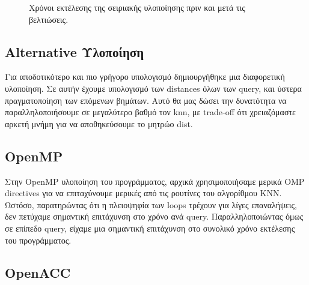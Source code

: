 \documentclass[11pt]{scrartcl} %
\begin{document}
\begin{figure}[H]
    \begin{center}
    \end{center}
    \caption{Χρόνοι εκτέλεσης της σειριακής υλοποίησης πριν και μετά τις βελτιώσεις.}
    \label{fig:before_after_times}
\end{figure}

\subsection{Alternative Υλοποίηση}
Για αποδοτικότερο και πιο γρήγορο υπολογισμό δημιουργήθηκε μια διαφορετική υλοποίηση. Σε αυτήν έχουμε υπολογισμό των distances όλων των query,
και ύστερα πραγματοποίηση των επόμενων βημάτων. Αυτό θα μας δώσει την δυνατότητα να παραλληλοποιήσουμε σε μεγαλύτερο βαθμό τον knn, με
trade-off ότι χρειαζόμαστε αρκετή μνήμη για να αποθηκεύσουμε το μητρώο dist.

\subsection{OpenMP}

Στην OpenMP υλοποίηση του προγράμματος, αρχικά χρησιμοποιήσαμε μερικά OMP directives
για να επιταχύνουμε μερικές από τις ρουτίνες του αλγορίθμου ΚΝΝ.
Ωστόσο, παρατηρώντας ότι η πλειοψηφία των loops τρέχουν για λίγες επαναλήψεις, δεν πετύχαμε σημαντική επιτάχυνση στο χρόνο ανά query.
Παραλληλοποιώντας όμως σε επίπεδο query, είχαμε μια σημαντική επιτάχυνση στο συνολικό χρόνο εκτέλεσης του προγράμματος.

\subsection{OpenACC}
\end{document}
